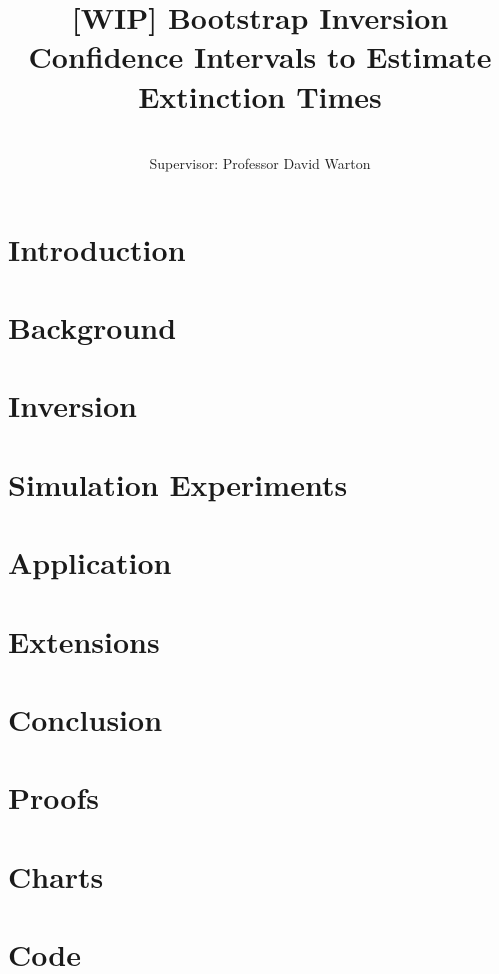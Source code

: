 \documentclass[honours,12pt]{UNSWthesis}
\title{[WIP] Bootstrap Inversion Confidence Intervals to Estimate Extinction Times}
\author{\Authornameonly\\{\bigskip}Supervisor: Professor David Warton}
\begin{document}
%
%

\beforepreface

\afterpage{\blankpage}







\afterpreface

\afterpage{\blankpage}

%
%

\chapter{Introduction}\label{chap: intro}


\chapter{Background}\label{chap: background}


\chapter{Inversion}\label{chap: inversion}


\chapter{Simulation Experiments}\label{chap: experiments}


\chapter{Application}\label{chap: application}


\chapter{Extensions}\label{chap: extensions}


\chapter{Conclusion}\label{chap: conclusion}


\appendix

\chapter{Proofs}
\label{apx: A}

\chapter{Charts}

\chapter{Code}


\end{document}

